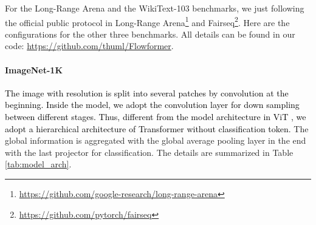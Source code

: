 \documentclass[nohyperref]{article}
\theoremstyle{plain}
\theoremstyle{definition}
\theoremstyle{remark}
\newcommand{\update}[1]{{\textcolor{black}{#1}}}
\begin{document}
For the Long-Range Arena \cite{Tay2021LongRA} and the WikiText-103 \cite{Merity2017PointerSM} benchmarks, we just following the official public protocol in Long-Range Arena\footnote{\url{https://github.com/google-research/long-range-arena}} and Fairseq\footnote{\url{https://github.com/pytorch/fairseq}}. Here are the configurations for the other three benchmarks. All details can be found in our code: \href{https://github.com/thuml/Flowformer}{https://github.com/thuml/Flowformer}.

\paragraph{ImageNet-1K} 
\update{The image with resolution  is split into several patches by convolution at the beginning. Inside the model, we adopt the convolution layer for down sampling between different stages. Thus, different from the model architecture in ViT \cite{dosovitskiy2021an}, we adopt a hierarchical architecture of Transformer without classification token.} The global information is aggregated with the global average pooling layer in the end with the last projector for classification. The details are summarized in Table \ref{tab:model_arch}.

\begin{table}[h]
\vspace{-15pt}
	\caption{Hierarchical architecture for vision recognization task.}
	\label{tab:model_arch}
	\vskip 0.1in
	\centering
	\begin{small}
		\begin{sc}
			\renewcommand{\multirowsetup}{\centering}
		\end{sc}
	\end{small}
	\vspace{-10pt}
\end{table}
\end{document}
